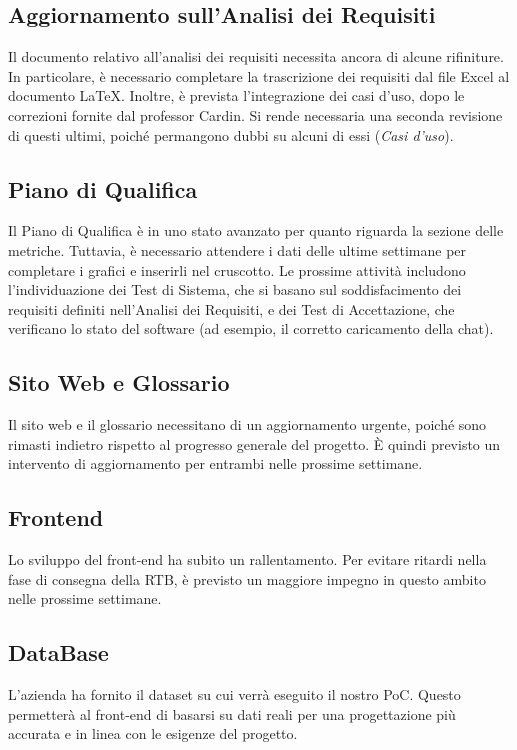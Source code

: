 \documentclass{article}
\begin{document}
\subsection{Aggiornamento sull'Analisi dei Requisiti}
Il documento relativo all'analisi dei requisiti necessita ancora di alcune rifiniture. In particolare, è necessario completare la trascrizione dei requisiti dal file Excel al documento LaTeX. Inoltre, è prevista l'integrazione dei casi d'uso, dopo le correzioni fornite dal professor Cardin. Si rende necessaria una seconda revisione di questi ultimi, poiché permangono dubbi su alcuni di essi (\textit{Casi d'uso}).

\subsection{Piano di Qualifica}
Il Piano di Qualifica è in uno stato avanzato per quanto riguarda la sezione delle metriche. Tuttavia, è necessario attendere i dati delle ultime settimane per completare i grafici e inserirli nel cruscotto. Le prossime attività includono l'individuazione dei Test di Sistema, che si basano sul soddisfacimento dei requisiti definiti nell'Analisi dei Requisiti, e dei Test di Accettazione, che verificano lo stato del software (ad esempio, il corretto caricamento della chat).

\subsection{Sito Web e Glossario}
Il sito web e il glossario necessitano di un aggiornamento urgente, poiché sono rimasti indietro rispetto al progresso generale del progetto. È quindi previsto un intervento di aggiornamento per entrambi nelle prossime settimane.

\subsection{Frontend}
Lo sviluppo del front-end ha subito un rallentamento. Per evitare ritardi nella fase di consegna della RTB, è previsto un maggiore impegno in questo ambito nelle prossime settimane.

\subsection{DataBase}
L'azienda ha fornito il dataset su cui verrà eseguito il nostro PoC. Questo permetterà al front-end di basarsi su dati reali per una progettazione più accurata e in linea con le esigenze del progetto.
\end{document}
